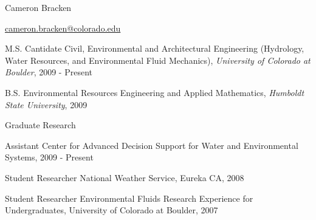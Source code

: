 \documentclass[10pt,a4paper]{scrartcl}
\begin{document}
    \begin{cv}{}
        \begin{cvlist}{}\label{info}  
            \item   Cameron Bracken
            \item   \url{cameron.bracken@colorado.edu}
        \end{cvlist}
        
        \begin{cvlist}{}\label{edu}
            \item[M.S. Cantidate]   { Civil, Environmental and Architectural Engineering (Hydrology, Water Resources, and Environmental Fluid Mechanics)}, {\it University of Colorado at Boulder}, 2009 - Present 
            \item[B.S.]   { Environmental Resources Engineering and Applied Mathematics}, {\it Humboldt State University}, 2009
        \end{cvlist}
        
        \begin{cvlist}{}\label{exp}
            {\setlength{\itemsep}{1pt}
            \setlength{\parskip}{0pt}
            \setlength{\parsep}{0pt}
            
            \item[Graduate Research]
            \item[Assistant] Center for Advanced Decision Support for Water and Environmental Systems, 2009 - Present
            }
            \item[Student Researcher] National Weather Service, Eureka CA, 2008
            \item[Student Researcher] Environmental Fluids Research Experience for Undergraduates, University of Colorado at Boulder, 2007
        \end{cvlist}
        

\end{cv}
\end{document}
